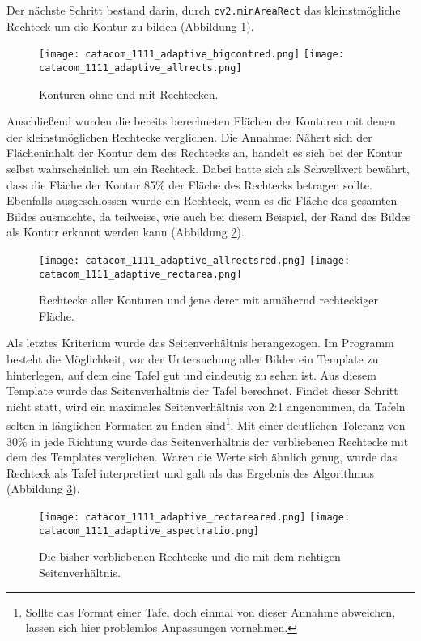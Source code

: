 Der nächste Schritt bestand darin, durch \verb|cv2.minAreaRect| das kleinstmögliche Rechteck um die Kontur zu bilden (Abbildung \ref{fig:adaptiverectangles}).
\begin{figure}[h!]
\texttt{[image: catacom\_1111\_adaptive\_bigcontred.png]}
\texttt{[image: catacom\_1111\_adaptive\_allrects.png]}
\caption{Konturen ohne und mit Rechtecken.}
\label{fig:adaptiverectangles}
\end{figure}

Anschließend wurden die bereits berechneten Flächen der Konturen mit denen der kleinstmöglichen Rechtecke verglichen. Die Annahme: Nähert sich der Flächeninhalt der Kontur dem des Rechtecks an, handelt es sich bei der Kontur selbst wahrscheinlich um ein Rechteck. Dabei hatte sich als Schwellwert bewährt, dass die Fläche der Kontur 85\% der Fläche des Rechtecks betragen sollte. Ebenfalls ausgeschlossen wurde ein Rechteck, wenn es die Fläche des gesamten Bildes ausmachte, da teilweise, wie auch bei diesem Beispiel, der Rand des Bildes als Kontur erkannt werden kann (Abbildung \ref{fig:adaptivrect}).
\begin{figure}[h!]
\texttt{[image: catacom\_1111\_adaptive\_allrectsred.png]}
\texttt{[image: catacom\_1111\_adaptive\_rectarea.png]}
\caption{Rechtecke aller Konturen und jene derer mit annähernd rechteckiger Fläche.}
\label{fig:adaptivrect}
\end{figure}

Als letztes Kriterium wurde das Seitenverhältnis herangezogen. Im Programm besteht die Möglichkeit, vor der Untersuchung aller Bilder ein Template zu hinterlegen, auf dem eine Tafel gut und eindeutig zu sehen ist. Aus diesem Template wurde das Seitenverhältnis der Tafel berechnet. Findet dieser Schritt nicht statt, wird ein maximales Seitenverhältnis von 2:1 angenommen, da Tafeln selten in länglichen Formaten zu finden sind\footnote{Sollte das Format einer Tafel doch einmal von dieser Annahme abweichen, lassen sich hier problemlos Anpassungen vornehmen.}. Mit einer deutlichen Toleranz von 30\% in jede Richtung wurde das Seitenverhältnis der verbliebenen Rechtecke mit dem des Templates verglichen. Waren die Werte sich ähnlich genug, wurde das Rechteck als Tafel interpretiert und galt als das Ergebnis des Algorithmus (Abbildung \ref{fig:aspectratio}).
\begin{figure}[h!]
\texttt{[image: catacom\_1111\_adaptive\_rectareared.png]}
\texttt{[image: catacom\_1111\_adaptive\_aspectratio.png]}
\caption{Die bisher verbliebenen Rechtecke und die mit dem richtigen Seitenverhältnis.}
\label{fig:aspectratio}
\end{figure}
 
